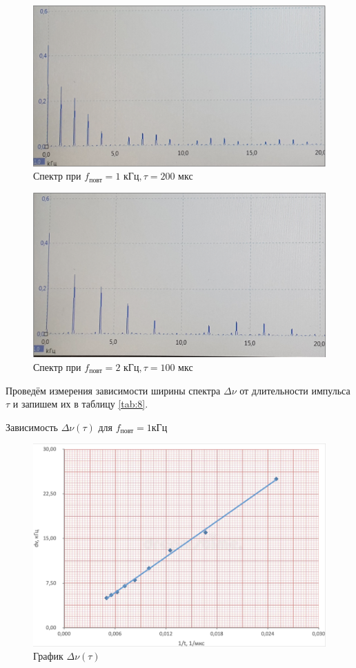 \documentclass[12pt,a4paper]{article}
\begin{document}
\begin{figure}[H]
	\centering
	\includegraphics[width = 7 cm]{src/7_a.png}
	\caption{Спектр при $f_\text{повт} = 1 \text{ кГц}, \tau = 200 \text{ мкс}$}
	\label{fig:7a}
\end{figure}

\begin{figure}[H]
	\centering
	\includegraphics[width = 7 cm]{src/7_b.png}
	\caption{Спектр при $f_\text{повт} = 2 \text{ кГц}, \tau = 100 \text{ мкс}$}
	\label{fig:7b}
\end{figure}

Проведём измерения зависимости ширины спектра $\Delta \nu$ от длительности импульса $\tau$ и запишем их в таблицу \ref{tab:8}.

\begin{table}[H]
    \caption{Зависимость $\Delta \nu (\tau)$ для $f_\text{повт} = 1 \text{кГц}$}
    
	\label{tab:8}
\end{table}

\begin{figure}[h]
	\centering
	\includegraphics[width = 10 cm]{src/8.png}
	\caption{График $\Delta \nu (\tau)$}
	\label{fig:8}
\end{figure}
\end{document}
